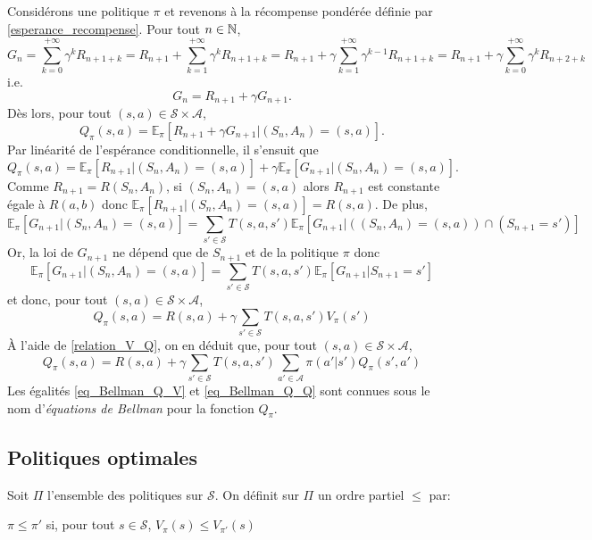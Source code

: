 Considérons une politique $\pi$ et revenons à la récompense pondérée définie par \eqref{esperance_recompense}. Pour tout $n\in\mathbb{N}$,
$$G_{n} = \sum_{k=0}^{+\infty} \gamma^k R_{n+1+k} = R_{n+1} + \sum_{k=1}^{+\infty} \gamma^k R_{n+1+k} = R_{n+1} + \gamma \sum_{k=1}^{+\infty} \gamma^{k-1} R_{n+1+k} = R_{n+1} + \gamma \sum_{k=0}^{+\infty} \gamma^{k} R_{n+2+k}$$
i.e.
$$G_{n} = R_{n+1} + \gamma G_{n+1}.$$
Dès lors, pour tout $(s,a)\in\mathcal{S}\times\mathcal{A}$,
$$Q_{\pi}(s,a)=\mathbb{E}_{\pi}[R_{n+1} + \gamma G_{n+1} | (S_n,A_n)=(s,a)].$$
Par linéarité de l'espérance conditionnelle, il s'ensuit que
$$Q_{\pi}(s,a)=\mathbb{E}_{\pi}[R_{n+1} | (S_n,A_n)=(s,a)] + \gamma \mathbb{E}_{\pi}[G_{n+1} | (S_n,A_n)=(s,a)].$$
Comme $R_{n+1}=R(S_n, A_n)$, si $(S_n,A_n)=(s,a)$ alors $R_{n+1}$ est constante égale à $R(a,b)$ donc $\mathbb{E}_{\pi}[R_{n+1} | (S_n,A_n)=(s,a)]=R(s,a)$. De plus, 
$$\mathbb{E}_{\pi}[G_{n+1} | (S_n,A_n)=(s,a)]= \sum_{s'\in\mathcal{S}} T(s,a,s') \mathbb{E}_{\pi}[G_{n+1} | ((S_n,A_n)=(s,a))\cap(S_{n+1}=s')]$$
Or, la loi de $G_{n+1}$ ne dépend que de $S_{n+1}$ et de la politique $\pi$ donc 
$$\mathbb{E}_{\pi}[G_{n+1} | (S_n,A_n)=(s,a)]=\sum_{s'\in\mathcal{S}} T(s,a,s') \mathbb{E}_{\pi}[G_{n+1} | S_{n+1}=s']$$
et donc, pour tout $(s,a)\in\mathcal{S}\times\mathcal{A}$,
\begin{equation}
Q_{\pi}(s,a)=R(s,a)+\gamma \sum_{s'\in\mathcal{S}} T(s,a,s') V_{\pi}(s')
\label{eq_Bellman_Q_V}
\end{equation}
\`A l'aide de \eqref{relation_V_Q}, on en déduit que, pour tout $(s,a)\in\mathcal{S}\times\mathcal{A}$,
\begin{equation}
Q_{\pi}(s,a)=R(s,a)+\gamma\sum_{s'\in\mathcal{S}} T(s,a,s')\sum_{a'\in \mathcal{A}} \pi(a'|s') Q_{\pi}(s',a')
\label{eq_Bellman_Q_Q}
\end{equation}
Les égalités \eqref{eq_Bellman_Q_V} et \eqref{eq_Bellman_Q_Q} sont connues sous le nom d'\textit{équations de Bellman} pour la fonction $Q_{\pi}$.

\subsection{Politiques optimales}

Soit $\Pi$ l'ensemble des politiques sur $\mathcal{S}$. On définit sur $\Pi$ un ordre partiel $\leqslant$ par: 
\begin{center}
	$\pi \leqslant \pi'$ si, pour tout $s\in\mathcal{S}$, $V_{\pi}(s) \leqslant V_{\pi'}(s)$
\end{center}

